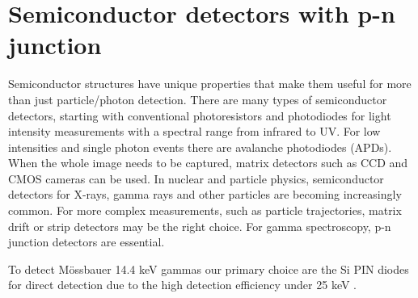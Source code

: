 
\chapter{Semiconductor detectors with p-n junction}
Semiconductor structures have unique properties that make them useful for more than just particle/photon detection. There are many types of semiconductor detectors, starting with conventional photoresistors and photodiodes for light intensity measurements with a spectral range from infrared to UV. For low intensities and single photon events there are avalanche photodiodes (APDs). When the whole image needs to be captured, matrix detectors such as CCD and CMOS cameras can be used. In nuclear and particle physics, semiconductor detectors for X-rays, gamma rays and other particles are becoming increasingly common. For more complex measurements, such as particle trajectories, matrix drift or strip detectors may be the right choice. For gamma spectroscopy, p-n junction detectors are essential.

\par
To detect Mössbauer 14.4 keV gammas our primary choice are the Si PIN diodes for direct detection due to the high detection efficiency under 25 keV \cite{SiCdTe}. 

